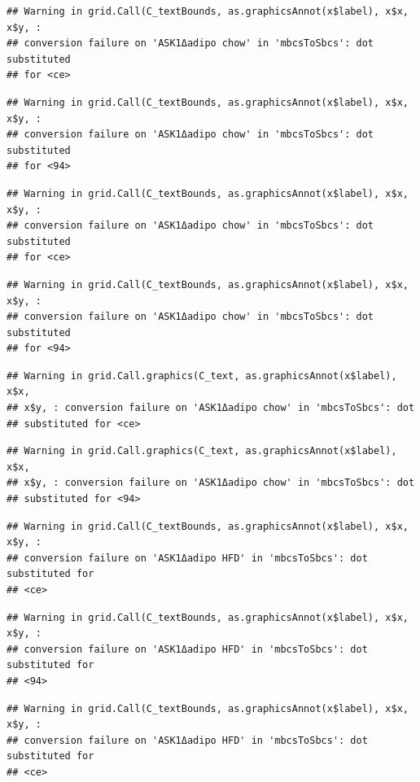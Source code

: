 \documentclass[]{book}
\begin{document}
\begin{verbatim}
## Warning in grid.Call(C_textBounds, as.graphicsAnnot(x$label), x$x, x$y, :
## conversion failure on 'ASK1Δadipo chow' in 'mbcsToSbcs': dot substituted
## for <ce>
\end{verbatim}

\begin{verbatim}
## Warning in grid.Call(C_textBounds, as.graphicsAnnot(x$label), x$x, x$y, :
## conversion failure on 'ASK1Δadipo chow' in 'mbcsToSbcs': dot substituted
## for <94>
\end{verbatim}

\begin{verbatim}
## Warning in grid.Call(C_textBounds, as.graphicsAnnot(x$label), x$x, x$y, :
## conversion failure on 'ASK1Δadipo chow' in 'mbcsToSbcs': dot substituted
## for <ce>
\end{verbatim}

\begin{verbatim}
## Warning in grid.Call(C_textBounds, as.graphicsAnnot(x$label), x$x, x$y, :
## conversion failure on 'ASK1Δadipo chow' in 'mbcsToSbcs': dot substituted
## for <94>
\end{verbatim}

\begin{verbatim}
## Warning in grid.Call.graphics(C_text, as.graphicsAnnot(x$label), x$x,
## x$y, : conversion failure on 'ASK1Δadipo chow' in 'mbcsToSbcs': dot
## substituted for <ce>
\end{verbatim}

\begin{verbatim}
## Warning in grid.Call.graphics(C_text, as.graphicsAnnot(x$label), x$x,
## x$y, : conversion failure on 'ASK1Δadipo chow' in 'mbcsToSbcs': dot
## substituted for <94>
\end{verbatim}

\begin{verbatim}
## Warning in grid.Call(C_textBounds, as.graphicsAnnot(x$label), x$x, x$y, :
## conversion failure on 'ASK1Δadipo HFD' in 'mbcsToSbcs': dot substituted for
## <ce>
\end{verbatim}

\begin{verbatim}
## Warning in grid.Call(C_textBounds, as.graphicsAnnot(x$label), x$x, x$y, :
## conversion failure on 'ASK1Δadipo HFD' in 'mbcsToSbcs': dot substituted for
## <94>
\end{verbatim}

\begin{verbatim}
## Warning in grid.Call(C_textBounds, as.graphicsAnnot(x$label), x$x, x$y, :
## conversion failure on 'ASK1Δadipo HFD' in 'mbcsToSbcs': dot substituted for
## <ce>
\end{verbatim}
\end{document}
